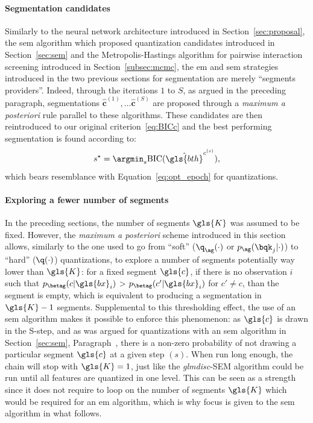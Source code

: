 \paragraph{Segmentation candidates}
Similarly to the neural network architecture introduced in Section~\ref{sec:proposal}, the \gls{sem} algorithm which proposed quantization candidates introduced in Section~\ref{sec:sem} and the Metropolis-Hastings algorithm for pairwise interaction screening introduced in Section~\ref{subsec:mcmc}, the \gls{em} and \gls{sem} strategies introduced in the two previous sections for segmentation are merely ``segments providers''. Indeed, through the iterations $1$ to $S$, as argued in the preceding paragraph, segmentations $\hat{\mathbf{c}}^{(1)}, \dots \hat{\mathbf{c}}^{(S)}$ are proposed through a \textit{maximum a posteriori} rule parallel to these algorithms. These candidates are then reintroduced to our original criterion~\eqref{eq:BICc} and the best performing segmentation is found according to:
\begin{equation} \label{eq:BICtree}
s^\star = \argmin_s \text{BIC}(\hat{\gls{bth}}^{c^{(s)}}),
\end{equation}
which bears resemblance with Equation~\eqref{eq:opt_epoch} for quantizations.

\paragraph{Exploring a fewer number of segments}
In the preceding sections, the number of segments $\gls{K}$ was assumed to be fixed. However, the \textit{maximum a posteriori} scheme introduced in this section allows, similarly to the one used to go from ``soft'' ($\q_{\ag}(\cdot)$ or $p_{\ag}(\bqk_j | \cdot)$) to ``hard'' ($\q(\cdot)$) quantizations, to explore a number of segments potentially way lower than $\gls{K}$: for a fixed segment $\gls{c}$, if there is no observation $i$ such that $p_{\betag}(c | \gls{bx}_i)$ > $p_{\betag}(c' | \gls{bx}_i)$ for $c' \neq c$, than the segment is empty, which is equivalent to producing a segmentation in $\gls{K}-1$ segments. Supplemental to this thresholding effect, the use of an \gls{sem} algorithm makes it possible to enforce this phenomenon: as $\gls{c}$ is drawn in the S-step, and as was argued for quantizations with an \gls{sem} algorithm in Section~\ref{sec:sem}, Paragraph~, there is a non-zero probability of not drawing a particular segment $\gls{c}$ at a given step $(s)$. When run long enough, the chain will stop with $\gls{K} = 1$, just like the \textit{glmdisc}-SEM algorithm could be run until all features are quantized in one level. This can be seen as a strength since it does not require to loop on the number of segments $\gls{K}$ which would be required for an \gls{em} algorithm, which is why focus is given to the \gls{sem} algorithm in what follows.


